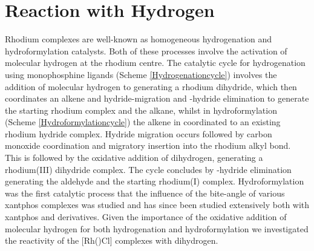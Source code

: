 \section{Reaction with Hydrogen}
\label{section:rhodiumhydride}

Rhodium complexes are well-known as homogeneous hydrogenation and hydroformylation catalysts.  Both of these processes involve the activation of molecular hydrogen at the rhodium centre.  The catalytic cycle for hydrogenation using monophosphine ligands (Scheme \ref{Hydrogenationcycle}) involves the addition of molecular hydrogen to \ce{[Rh(PR3)2Cl]} generating a rhodium dihydride, which then coordinates an alkene and hydride-migration and \chembeta-hydride elimination to generate the starting rhodium complex and the alkane, whilst in hydroformylation (Scheme \ref{Hydroformylationcycle}) the alkene in coordinated to an existing rhodium hydride complex.  Hydride migration occurs followed by carbon monoxide coordination and migratory insertion into the rhodium alkyl bond.  This is followed by the oxidative addition of dihydrogen, generating a rhodium(III) dihydride complex.  The cycle concludes by \chembeta-hydride elimination generating the aldehyde and the starting rhodium(I) complex.  Hydroformylation was the first catalytic process that the influence of the bite-angle of various xantphos complexes was studied\cite{Kranenburg1995} and has since been studied extensively both with xantphos and derivatives.\cite{Bronger2002, Bronger2003, Bronger2004, Bronger2004b, Bronger2004c, Buhling1997, Buhling1997b, Dieleman2001, Dierkes1999, Freixa2003, Goedheijt1998b, Kamer2001, Leclercq2005, Leeuwen1999, Leeuwen2000, Mora2007, Sandee1999, Silva2003, Veen1999, Veen2000, Vlugt2004, Zuidema2007, Zuidema2008, Zuidema2010}  Given the importance of the oxidative addition of molecular hydrogen for both hydrogenation and hydroformylation we investigated the reactivity of the [Rh(\tBuxantphosk)Cl] complexes with dihydrogen.  

